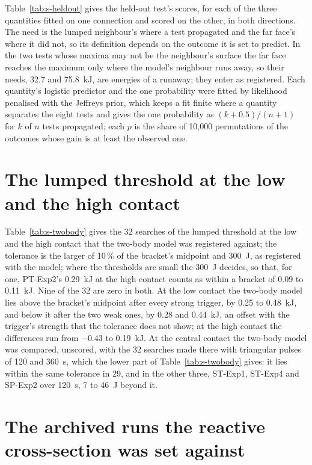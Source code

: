 \documentclass[preprint,12pt]{elsarticle}
\begin{document}
Table~\ref{tab:s-heldout} gives the held-out test's scores, for each of the three quantities fitted on one connection and scored on the other, in both directions. The need is the lumped neighbour's where a test propagated and the far face's where it did not, so its definition depends on the outcome it is set to predict. In the two tests whose maxima may not be the neighbour's surface the far face reaches the maximum only where the model's neighbour runs away, so their needs, 32.7 and 75.8~kJ, are energies of a runaway; they enter as registered. Each quantity's logistic predictor and the one probability were fitted by likelihood penalised with the Jeffreys prior, which keeps a fit finite where a quantity separates the eight tests and gives the one probability as $(k+0.5)/(n+1)$ for $k$ of $n$ tests propagated; each $p$ is the share of 10,000 permutations of the outcomes whose gain is at least the observed one.



\section{The lumped threshold at the low and the high contact}
\label{sec:s-twobody}

Table~\ref{tab:s-twobody} gives the 32 searches of the lumped threshold at the low and the high contact that the two-body model was registered against; the tolerance is the larger of 10\,\% of the bracket's midpoint and 300~J, as registered with the model; where the thresholds are small the 300~J decides, so that, for one, PT-Exp2's 0.29~kJ at the high contact counts as within a bracket of 0.09 to 0.11~kJ. Nine of the 32 are zero in both. At the low contact the two-body model lies above the bracket's midpoint after every strong trigger, by 0.25 to 0.48~kJ, and below it after the two weak ones, by 0.28 and 0.44~kJ, an offset with the trigger's strength that the tolerance does not show; at the high contact the differences run from $-0.43$ to 0.19~kJ. At the central contact the two-body model was compared, unscored, with the 32 searches made there with triangular pulses of 120 and 360~s, which the lower part of Table~\ref{tab:s-twobody} gives: it lies within the same tolerance in 29, and in the other three, ST-Exp1, ST-Exp4 and SP-Exp2 over 120~s, 7 to 46~J beyond it.


\section{The archived runs the reactive cross-section was set against}
\label{sec:s-archived}
\end{document}
